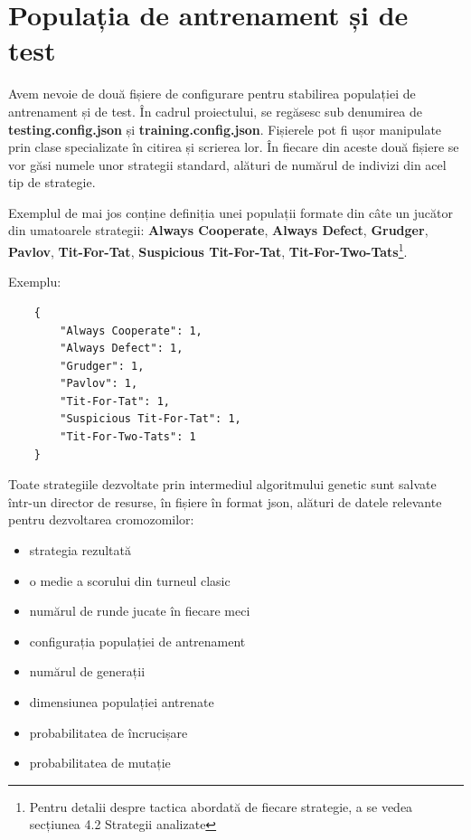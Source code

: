 \section{Populația de antrenament și de test}

Avem nevoie de două fișiere de configurare pentru stabilirea populației de antrenament și de test. În cadrul proiectului, se regăsesc sub denumirea de \textbf{testing.config.json} și \textbf{training.config.json}. Fișierele pot fi ușor manipulate prin clase specializate în citirea și scrierea lor. În fiecare din aceste două fișiere se vor găsi numele unor strategii standard, alături de numărul de indivizi din acel tip de strategie. 

Exemplul de mai jos conține definiția unei populații formate din câte un jucător din umatoarele strategii: \textbf{Always Cooperate}, \textbf{Always Defect}, \textbf{Grudger}, \textbf{Pavlov}, \textbf{Tit-For-Tat}, \textbf{Suspicious Tit-For-Tat}, \textbf{Tit-For-Two-Tats}\footnote{Pentru detalii despre tactica abordată de fiecare strategie, a se vedea secțiunea 4.2 Strategii analizate}.

Exemplu: 

\begin{lstlisting}
	{
		"Always Cooperate": 1,
		"Always Defect": 1,
		"Grudger": 1,
		"Pavlov": 1,
		"Tit-For-Tat": 1,
		"Suspicious Tit-For-Tat": 1,
		"Tit-For-Two-Tats": 1
	}
\end{lstlisting}

 
Toate strategiile dezvoltate prin intermediul algoritmului genetic sunt salvate într-un director de resurse, în fișiere în format json, alături de datele relevante pentru dezvoltarea cromozomilor: 
\begin{itemize}
	 \item[\textasteriskcentered] strategia rezultată 
  	 \item[\textasteriskcentered] o medie a scorului din turneul clasic 
  	 \item[\textasteriskcentered] numărul de runde jucate în fiecare meci 
  	 \item[\textasteriskcentered] configurația populației de antrenament 
  	 \item[\textasteriskcentered] numărul de generații 
  	 \item[\textasteriskcentered] dimensiunea populației antrenate
  	 \item[\textasteriskcentered] probabilitatea de încrucișare 
  	 \item[\textasteriskcentered] probabilitatea de mutație 
\end{itemize} 

